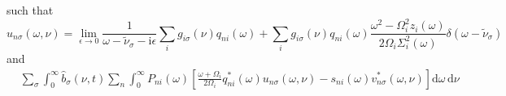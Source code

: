 such that
\begin{equation}
u_{n\sigma}(\omega,\nu) = \lim_{\epsilon\to0}\frac{1}{\omega - \tilde{\nu}_\sigma - \mathrm{i}\epsilon}\sum_ig_{i\sigma}(\nu)q_{ni}(\omega) + \sum_ig_{i\sigma}(\nu)q_{ni}(\omega)\frac{\omega^2 - \Omega_i^2z_i(\omega)}{2\Omega_i\Sigma_i^2(\omega)}\delta(\omega - \tilde{\nu}_\sigma)
\end{equation}
and
\begin{equation}
\begin{split}
&\sum_\sigma\int_0^\infty\hat{b}_\sigma(\nu,t)\sum_n\int_0^\infty P_{ni}(\omega)\left[\frac{\omega + \Omega_i}{2\Omega_i}q_{ni}^*(\omega)u_{n\sigma}(\omega,\nu) - s_{ni}(\omega)v_{n\sigma}^*(\omega,\nu)\right]\mathrm{d}\omega\,\mathrm{d}\nu\\

\end{split}
\end{equation}
